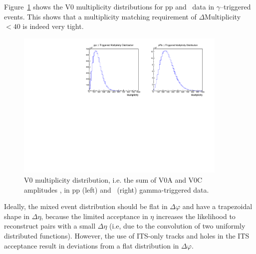 Figure~\ref{fig:Multiplicitydistributions} shows the V0 multiplicity distributions for pp and \pPb~data in $\gamma$--triggered events. This shows that a multiplicity matching requirement of \(\Delta\)Multiplicity \(< 40\) is indeed very tight.

\begin{figure}[h]
  \center
  \includegraphics[width=0.9\textwidth]{Data_Analysis/EventMixing/Abs_Multplicity_Dist.pdf}
  \caption{V0 multiplicity distribution, i.e. the sum of V0A and V0C amplitudes , in pp (left) and \pPb~(right) gamma-triggered data.}
  \label{fig:Multiplicitydistributions}
\end{figure}

Ideally, the mixed event distribution should be flat in \(\Delta\varphi\) and have a trapezoidal shape in \(\Delta\eta\), because the limited acceptance in \(\eta\) increases the likelihood to reconstruct pairs with a small \(\Delta\eta\) (i.e, due to the convolution of two uniformly distributed functions). However, the use of ITS-only tracks and holes in the ITS acceptance result in deviations from a flat distribution in \(\Delta\varphi\). %

